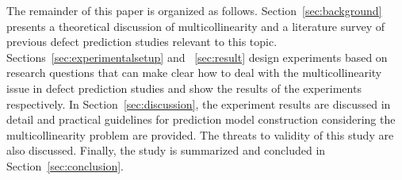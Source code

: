 The remainder of this paper is organized as follows. Section~\ref{sec:background} presents a theoretical discussion of multicollinearity and a literature survey of previous defect prediction studies relevant to this topic.
Sections~\ref{sec:experimentalsetup} and ~\ref{sec:result} design experiments based on research questions that can make clear how to deal with the multicollinearity issue in defect prediction studies and show the results of the experiments respectively. In Section~\ref{sec:discussion}, the experiment results are discussed in detail and practical guidelines for prediction model construction considering the multicollinearity problem are provided. The threats to validity of this study are also discussed. Finally, the study is summarized and concluded in Section~\ref{sec:conclusion}.

\clearpage